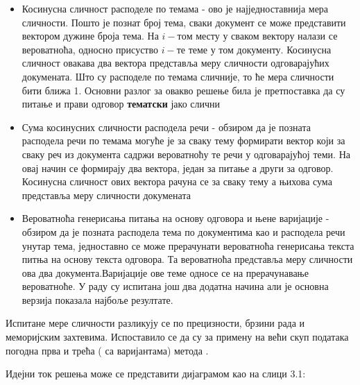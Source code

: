 \begin{itemize}
\item Косинусна сличност расподеле по темама - ово је најједноставнија мера сличности. Пошто је познат број тема, сваки документ се може представити вектором дужине броја тема. На $i-том$ месту у сваком вектору налази се вероватноћа, односно присуство $i-те$ теме у том документу. Косинусна сличност овакава два вектора представља меру сличности одговарајућих докумената. Што су расподеле по темама сличније, то ће мера сличности бити ближа 1. Основни разлог за овакво решење била је претпоставка да су питање и прави одговор \textbf{тематски} јако слични

\item Сума косинусних сличности расподела речи - обзиром да је позната расподела речи по темама могуће је  за сваку тему формирати вектор који за сваку реч из документа садржи вероватноћу те речи у одговарајућој теми. На овај начин се формирају два вектора, један за питање а други за одговор. Косинусна сличност ових вектора рачуна се за сваку тему а њихова сума представља меру сличности докумената

\item Вероватноћа генерисања питања на основу одговора и њене варијације - обзиром да је позната расподела тема по документима као и расподела речи унутар тема, једноставно се може прерачунати вероватноћа генерисања текста питња на основу текста одговора. Та вероватноћа представља меру сличности ова два документа.Варијације ове теме односе се на прерачунавање вероватноће. У раду су испитана још два додатна начина али је основна верзија показала најбоље резултате.

\end{itemize}

Испитане мере сличности разликују се по прецизности, брзини рада и меморијским захтевима. Испоставило се да су  за примену на већи скуп података погодна прва и трећа ( са варијантама) метода .

Идејни ток решења може се представити  дијаграмом као на слици 3.1:

